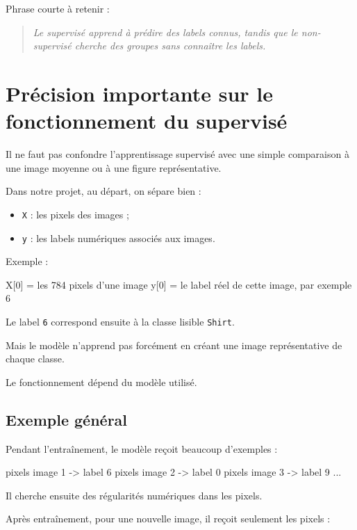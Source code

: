 \documentclass[11pt,a4paper]{article}
\begin{document}
Phrase courte à retenir :

\begin{quote}
\itshape Le supervisé apprend à prédire des labels connus, tandis que le non-supervisé cherche des groupes sans connaître les labels.
\end{quote}

\section{Précision importante sur le fonctionnement du supervisé}

Il ne faut pas confondre l'apprentissage supervisé avec une simple comparaison à une image moyenne ou à une figure représentative.

Dans notre projet, au départ, on sépare bien :

\begin{itemize}
\item \texttt{X} : les pixels des images ;
\item \texttt{y} : les labels numériques associés aux images.
\end{itemize}

Exemple :

\begin{codeblock}
X[0] = les 784 pixels d'une image
y[0] = le label réel de cette image, par exemple 6
\end{codeblock}

Le label \texttt{6} correspond ensuite à la classe lisible \texttt{Shirt}.

Mais le modèle n'apprend pas forcément en créant une image représentative de chaque classe.

Le fonctionnement dépend du modèle utilisé.

\subsection{Exemple général}

Pendant l'entraînement, le modèle reçoit beaucoup d'exemples :

\begin{codeblock}
pixels image 1 -> label 6
pixels image 2 -> label 0
pixels image 3 -> label 9
...
\end{codeblock}

Il cherche ensuite des régularités numériques dans les pixels.

Après entraînement, pour une nouvelle image, il reçoit seulement les pixels :
\end{document}
